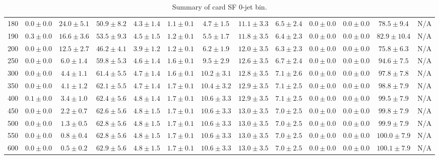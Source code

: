 \begin{table}
{\begin{center}
\begin{tabular}{l | c c | c c c c c c c c  | c c}
180 & $0.0\pm0.0$ & $24.0\pm5.1$ & $50.9\pm8.2$ & $4.3\pm1.4$ & $1.1\pm0.1$ & $4.7\pm1.5$ & $11.1\pm3.3$ & $6.5\pm2.4$ & $0.0\pm0.0$ & $0.0\pm0.0$ & $78.5\pm9.4$ & N/A \\
190 & $0.3\pm0.0$ & $16.6\pm3.6$ & $53.5\pm9.3$ & $4.5\pm1.5$ & $1.2\pm0.1$ & $5.5\pm1.7$ & $11.8\pm3.5$ & $6.4\pm2.3$ & $0.0\pm0.0$ & $0.0\pm0.0$ & $82.9\pm10.4$ & N/A \\
200 & $0.0\pm0.0$ & $12.5\pm2.7$ & $46.2\pm4.1$ & $3.9\pm1.2$ & $1.2\pm0.1$ & $6.2\pm1.9$ & $12.0\pm3.5$ & $6.3\pm2.3$ & $0.0\pm0.0$ & $0.0\pm0.0$ & $75.8\pm6.3$ & N/A \\
250 & $0.0\pm0.0$ & $6.0\pm1.4$ & $59.8\pm5.3$ & $4.6\pm1.4$ & $1.6\pm0.1$ & $9.5\pm2.9$ & $12.6\pm3.5$ & $6.7\pm2.4$ & $0.0\pm0.0$ & $0.0\pm0.0$ & $94.6\pm7.5$ & N/A \\
300 & $0.0\pm0.0$ & $4.4\pm1.1$ & $61.4\pm5.5$ & $4.7\pm1.4$ & $1.6\pm0.1$ & $10.2\pm3.1$ & $12.8\pm3.5$ & $7.1\pm2.6$ & $0.0\pm0.0$ & $0.0\pm0.0$ & $97.8\pm7.8$ &  N/A \\
350 & $0.0\pm0.0$ & $4.1\pm1.2$ & $62.1\pm5.5$ & $4.7\pm1.4$ & $1.7\pm0.1$ & $10.4\pm3.2$ & $12.9\pm3.5$ & $7.1\pm2.5$ & $0.0\pm0.0$ & $0.0\pm0.0$ & $98.8\pm7.9$ &  N/A \\
400 & $0.1\pm0.0$ & $3.4\pm1.0$ & $62.4\pm5.6$ & $4.8\pm1.4$ & $1.7\pm0.1$ & $10.6\pm3.3$ & $12.9\pm3.5$ & $7.1\pm2.5$ & $0.0\pm0.0$ & $0.0\pm0.0$ & $99.5\pm7.9$ &  N/A \\
450 & $0.0\pm0.0$ & $2.2\pm0.7$ & $62.6\pm5.6$ & $4.8\pm1.5$ & $1.7\pm0.1$ & $10.6\pm3.3$ & $13.0\pm3.5$ & $7.0\pm2.5$ & $0.0\pm0.0$ & $0.0\pm0.0$ & $99.8\pm7.9$ &  N/A \\
500 & $0.0\pm0.0$ & $1.3\pm0.5$ & $62.8\pm5.6$ & $4.8\pm1.5$ & $1.7\pm0.1$ & $10.6\pm3.3$ & $13.0\pm3.5$ & $7.0\pm2.5$ & $0.0\pm0.0$ & $0.0\pm0.0$ & $99.9\pm7.9$ &  N/A \\
550 & $0.0\pm0.0$ & $0.8\pm0.4$ & $62.8\pm5.6$ & $4.8\pm1.5$ & $1.7\pm0.1$ & $10.6\pm3.3$ & $13.0\pm3.5$ & $7.0\pm2.5$ & $0.0\pm0.0$ & $0.0\pm0.0$ & $100.0\pm7.9$ &  N/A \\
600 & $0.0\pm0.0$ & $0.5\pm0.2$ & $62.9\pm5.6$ & $4.8\pm1.5$ & $1.7\pm0.1$ & $10.6\pm3.3$ & $13.0\pm3.5$ & $7.0\pm2.5$ & $0.0\pm0.0$ & $0.0\pm0.0$ & $100.1\pm7.9$ &  N/A \\
\hline
\end{tabular}
\end{center}
}
\caption{Summary of card SF 0-jet bin.}
\end{table}
